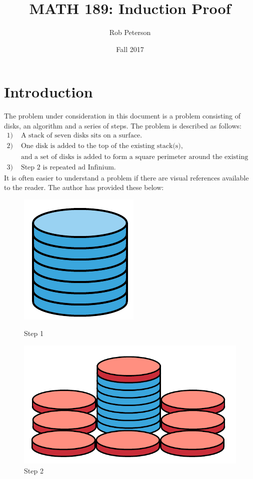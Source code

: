 \documentclass[11pt]{article}
\begin{document}
	\thispagestyle{empty}
	\title{MATH 189: Induction Proof}
	\author{Rob Peterson}
	\date{Fall 2017}
	\maketitle

	\newpage %


	\section{Introduction}
		The problem under consideration in this document is a problem consisting of disks, an algorithm and a series of steps.  
		The problem is described as follows:\
		\begin{align}
			1) &\text{ A stack of seven disks sits on a surface.}\\
			2) &\text{ One disk is added to the top of the existing stack(s),} \\
		    	    &\text{ and a set of disks is added to form a square perimeter around the existing stack(s).}\\
			3) &\text{ Step 2 is repeated ad Infinium.}
		\end{align}	
		It is often easier to understand a problem if there are visual references available to the reader.  The author has provided these below:\
		\begin{figure}[h]
			\includegraphics{step1.png}
			\caption{Step 1}
			\label{Step1_ortho}
			\includegraphics{step2.png}
			\caption{Step 2}
			\label{Step2_ortho}
		\end{figure}
	\newpage
\end{document}
